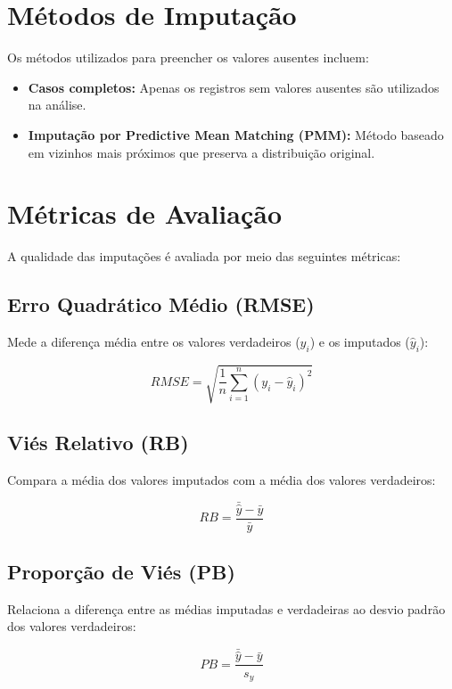 \documentclass{article}
\begin{document}
\section{Métodos de Imputação}

Os métodos utilizados para preencher os valores ausentes incluem:

\begin{itemize}
    \item \textbf{Casos completos:} Apenas os registros sem valores ausentes são utilizados na análise.
    \item \textbf{Imputação por Predictive Mean Matching (PMM):} Método baseado em vizinhos mais próximos que preserva a distribuição original.
\end{itemize}

\section{Métricas de Avaliação}

A qualidade das imputações é avaliada por meio das seguintes métricas:

\subsection{Erro Quadrático Médio (RMSE)}
Mede a diferença média entre os valores verdadeiros (\( y_i \)) e os imputados (\( \hat{y}_i \)):

\begin{equation}
    RMSE = \sqrt{\frac{1}{n} \sum_{i=1}^{n} (y_i - \hat{y}_i)^2}
\end{equation}

\subsection{Viés Relativo (RB)}
Compara a média dos valores imputados com a média dos valores verdadeiros:

\begin{equation}
    RB = \frac{\bar{\hat{y}} - \bar{y}}{\bar{y}}
\end{equation}

\subsection{Proporção de Viés (PB)}
Relaciona a diferença entre as médias imputadas e verdadeiras ao desvio padrão dos valores verdadeiros:

\begin{equation}
    PB = \frac{\bar{\hat{y}} - \bar{y}}{s_y}
\end{equation}
\end{document}
